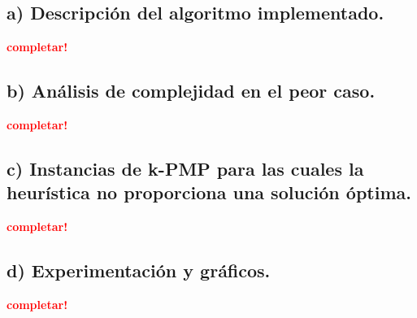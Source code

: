 \subsection{a) Descripción del algoritmo implementado.}
\vspace*{0.3cm}
\textcolor{red}{\textbf{completar!}}



\newpage
\subsection{b) Análisis de complejidad en el peor caso.}
\vspace*{0.3cm}
\textcolor{red}{\textbf{completar!}}



\newpage
\subsection{c) Instancias de k-PMP para las cuales la heurística no proporciona
            una solución óptima.}
\vspace*{0.3cm}
\textcolor{red}{\textbf{completar!}}



\newpage
\subsection{d) Experimentación y gráficos.}
\vspace*{0.3cm}
\textcolor{red}{\textbf{completar!}}
